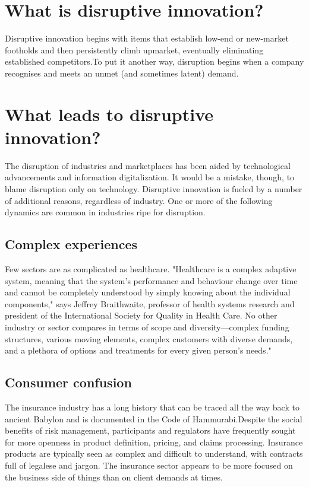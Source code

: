\documentclass[a4paper,15pt]{article}
\begin{document}
\pagestyle{fancy}
\tableofcontents
\empty
\section{What is disruptive innovation?}
Disruptive innovation begins with items that establish low-end or 
new-market footholds and then persistently climb upmarket, eventually
eliminating established competitors.To put it another way, disruption
begins when a company recognises and meets an unmet (and sometimes 
latent) demand.
\section{What leads to disruptive innovation?}
The disruption of industries and marketplaces has been aided by 
technological advancements and information digitalization. It would 
be a mistake, though, to blame disruption only on technology. 
Disruptive innovation is fueled by a number of additional reasons, 
regardless of industry. One or more of the following dynamics are 
common in industries ripe for disruption.
\subsection{Complex experiences}
Few sectors are as complicated as healthcare. "Healthcare is a 
complex adaptive system, meaning that the system's performance and 
behaviour change over time and cannot be completely understood by 
simply knowing about the individual components," says Jeffrey 
Braithwaite, professor of health systems research and president of 
the International Society for Quality in Health Care. No other 
industry or sector compares in terms of scope and diversity—complex 
funding structures, various moving elements, complex customers with 
diverse demands, and a plethora of options and treatments for every 
given person's needs."
\subsection{Consumer confusion}
The insurance industry has a long history that can be traced all the 
way back to ancient Babylon and is documented in the Code of 
Hammurabi.Despite the social benefits of risk management, 
participants and regulators have frequently sought for more openness 
in product definition, pricing, and claims processing. Insurance 
products are typically seen as complex and difficult to understand, 
with contracts full of legalese and jargon. The insurance sector 
appears to be more focused on the business side of things than on 
client demands at times.
\end{document}
